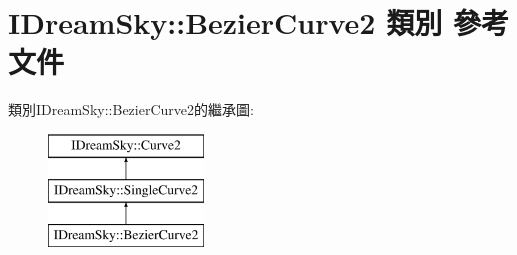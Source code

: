 \hypertarget{class_i_dream_sky_1_1_bezier_curve2}{}\section{I\+Dream\+Sky\+:\+:Bezier\+Curve2 類別 參考文件}
\label{class_i_dream_sky_1_1_bezier_curve2}
類別\+I\+Dream\+Sky\+:\+:Bezier\+Curve2的繼承圖\+:\begin{figure}[H]
\begin{center}
\leavevmode
\includegraphics[height=3.000000cm]{class_i_dream_sky_1_1_bezier_curve2}
\end{center}
\end{figure}
